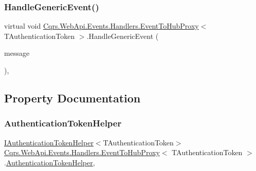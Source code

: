 \subsubsection{\texorpdfstring{Handle\+Generic\+Event()}{HandleGenericEvent()}}
{\footnotesize\ttfamily virtual void \hyperlink{classCqrs_1_1WebApi_1_1Events_1_1Handlers_1_1EventToHubProxy}{Cqrs.\+Web\+Api.\+Events.\+Handlers.\+Event\+To\+Hub\+Proxy}$<$ T\+Authentication\+Token $>$.Handle\+Generic\+Event (\begin{DoxyParamCaption}\item[{\hyperlink{interfaceCqrs_1_1Events_1_1IEvent}{I\+Event}$<$ T\+Authentication\+Token $>$}]{message }\end{DoxyParamCaption})\hspace{0.3cm}{\ttfamily [protected]}, {\ttfamily [virtual]}}



\subsection{Property Documentation}
\mbox{\label{classCqrs_1_1WebApi_1_1Events_1_1Handlers_1_1EventToHubProxy_af5593d8e6bace37fa52545c1f8e65e32}} 
\subsubsection{\texorpdfstring{Authentication\+Token\+Helper}{AuthenticationTokenHelper}}
{\footnotesize\ttfamily \hyperlink{interfaceCqrs_1_1Authentication_1_1IAuthenticationTokenHelper}{I\+Authentication\+Token\+Helper}$<$T\+Authentication\+Token$>$ \hyperlink{classCqrs_1_1WebApi_1_1Events_1_1Handlers_1_1EventToHubProxy}{Cqrs.\+Web\+Api.\+Events.\+Handlers.\+Event\+To\+Hub\+Proxy}$<$ T\+Authentication\+Token $>$.\hyperlink{classCqrs_1_1Authentication_1_1AuthenticationTokenHelper}{Authentication\+Token\+Helper}\hspace{0.3cm}{\ttfamily [get]}, {\ttfamily [protected]}}

\mbox{\label{classCqrs_1_1WebApi_1_1Events_1_1Handlers_1_1EventToHubProxy_a120e7cd3ad97d9e6382df657b9c98c4c}} 
